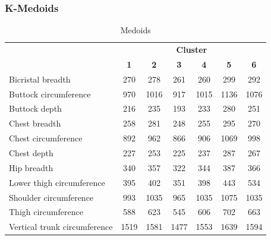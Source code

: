 \documentclass[12pt,a4paper,openany,UKenglish]{scrreprt}
\begin{document}
\subsubsection{K-Medoids}
\begin{table}[H]
	\footnotesize
	\centering
	\caption{Medoids}
	\begin{tabular}{lcccccc}
		\cline{2-7}
		                             & \multicolumn{6}{c}{\textbf{Cluster}}                                                                  \\
		                             & \textbf{1}                           & \textbf{2} & \textbf{3} & \textbf{4} & \textbf{5} & \textbf{6} \\
		\hline\hline
		Bicristal breadth            & 270                                  & 278        & 261        & 260        & 299        & 292        \\
		Buttock circumference        & 970                                  & 1016       & 917        & 1015       & 1136       & 1076       \\
		Buttock depth                & 216                                  & 235        & 193        & 233        & 280        & 251        \\
		Chest breadth                & 258                                  & 281        & 248        & 255        & 295        & 270        \\
		Chest circumference          & 892                                  & 962        & 866        & 906        & 1069       & 998        \\
		Chest depth                  & 227                                  & 253        & 225        & 237        & 287        & 267        \\
		Hip breadth                  & 340                                  & 357        & 322        & 344        & 387        & 366        \\
		Lower thigh circumference    & 395                                  & 402        & 351        & 398        & 443        & 534        \\
		Shoulder circumference       & 993                                  & 1035       & 965        & 1035       & 1075       & 1035       \\
		Thigh circumference          & 588                                  & 623        & 545        & 606        & 702        & 663        \\
		Vertical trunk circumference & 1519                                 & 1581       & 1477       & 1553       & 1639       & 1594       \\

\end{tabular}
\end{table}
\end{document}
